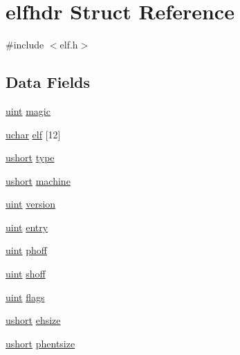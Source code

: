\hypertarget{structelfhdr}{\section{elfhdr Struct Reference}
\label{structelfhdr}
}


{\ttfamily \#include $<$elf.\-h$>$}

\subsection*{Data Fields}
\begin{DoxyCompactItemize}
\item 
\hyperlink{types_8h_a91ad9478d81a7aaf2593e8d9c3d06a14}{uint} \hyperlink{structelfhdr_a8f1cc7c49919fce5697bfbafc073003e}{magic}
\item 
\hyperlink{types_8h_a65f85814a8290f9797005d3b28e7e5fc}{uchar} \hyperlink{structelfhdr_aeba513355af321c78221dd668b203ab4}{elf} \mbox{[}12\mbox{]}
\item 
\hyperlink{types_8h_ab95f123a6c9bcfee6a343170ef8c5f69}{ushort} \hyperlink{structelfhdr_afa7787a68eb26fb33dc369c00db629ca}{type}
\item 
\hyperlink{types_8h_ab95f123a6c9bcfee6a343170ef8c5f69}{ushort} \hyperlink{structelfhdr_a46b8328012e01f0b16e4beab95b35911}{machine}
\item 
\hyperlink{types_8h_a91ad9478d81a7aaf2593e8d9c3d06a14}{uint} \hyperlink{structelfhdr_acb7e2a1d2504d82c52a9fa9b00bea040}{version}
\item 
\hyperlink{types_8h_a91ad9478d81a7aaf2593e8d9c3d06a14}{uint} \hyperlink{structelfhdr_a7fab9dad7727f5820bcce43d7649c872}{entry}
\item 
\hyperlink{types_8h_a91ad9478d81a7aaf2593e8d9c3d06a14}{uint} \hyperlink{structelfhdr_a3b2362e6eca2ec9d08ec047a8bcc13e4}{phoff}
\item 
\hyperlink{types_8h_a91ad9478d81a7aaf2593e8d9c3d06a14}{uint} \hyperlink{structelfhdr_a1f92826759f4567afd19bfe924be7f2b}{shoff}
\item 
\hyperlink{types_8h_a91ad9478d81a7aaf2593e8d9c3d06a14}{uint} \hyperlink{structelfhdr_a660f9db871d26052904976a8bfe8432d}{flags}
\item 
\hyperlink{types_8h_ab95f123a6c9bcfee6a343170ef8c5f69}{ushort} \hyperlink{structelfhdr_a671e08b578c02e1ab047c50ccb3abf84}{ehsize}
\item 
\hyperlink{types_8h_ab95f123a6c9bcfee6a343170ef8c5f69}{ushort} \hyperlink{structelfhdr_a2c1e074fc943b8556ed9b73af4dca3b3}{phentsize}
\item 

\end{DoxyCompactItemize}
